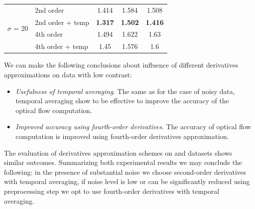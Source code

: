 \begin{table}[ht]
\begin{tabular}{ccccc}
    \midrule
    \multicolumn{1}{c}{\multirow{4}[1]{*}{$\sigma$ = 20}} & \multicolumn{1}{l}{2nd order} & 1.414 & 1.584 & 1.508 \\
    \multicolumn{1}{c}{} & \multicolumn{1}{l}{2nd order + temp} & \textbf{1.317} & \textbf{1.502} & \textbf{1.416} \\
    \multicolumn{1}{c}{} & \multicolumn{1}{l}{4th order} & 1.494 & 1.622 & 1.63 \\
    \multicolumn{1}{c}{} & \multicolumn{1}{l}{4th order + temp} & 1.45  & 1.576 & 1.6 \\
    \bottomrule
    \end{tabular}%
  \label{tab:derivatives_noise}%
\end{table}%

We can make the following conclusions about influence of different derivatives approximations on data with low contrast:
\begin{itemize}
	\item \textit{Usefulness of temporal averaging}. The same as for the case of noisy data, temporal averaging show to be effective to improve the accuracy of the optical flow computation. 
	\item \textit{Improved accuracy using fourth-order derivatives}. The accuracy of optical flow computation is improved using fourth-order derivatives approximation.
\end{itemize}

The evaluation of derivatives approximation schemes on \hyd and \mar datasets shows similar outcomes.  
Summarizing both experimental results we may conclude the following: in the presence of substantial noise we choose second-order derivatives with temporal averaging, if noise level is low or can be significantly reduced using preprocessing step we opt to use fourth-order derivatives with temporal averaging. 




